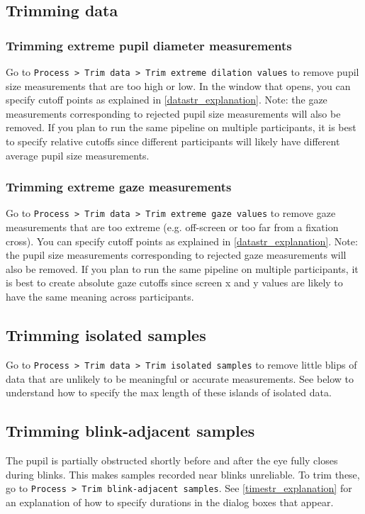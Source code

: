 \documentclass{article}
\begin{document}
\subsection{Trimming data}
\subsubsection{Trimming extreme pupil diameter measurements}
Go to \texttt{Process > Trim data > Trim extreme dilation values} to remove pupil size measurements that are too high or low. In the window that opens, you can specify cutoff points as explained in \ref{datastr_explanation}. Note: the gaze measurements corresponding to rejected pupil size measurements will also be removed. If you plan to run the same pipeline on multiple participants, it is best to specify relative cutoffs since different participants will likely have different average pupil size measurements.
\subsubsection{Trimming extreme gaze measurements}
Go to \texttt{Process > Trim data > Trim extreme gaze values} to remove gaze measurements that are too extreme (e.g. off-screen or too far from a fixation cross). You can specify cutoff points as explained in \ref{datastr_explanation}. Note: the pupil size measurements corresponding to rejected gaze measurements will also be removed. If you plan to run the same pipeline on multiple participants, it is best to create absolute gaze cutoffs since screen x and y values are likely to have the same meaning across participants.
\subsection{Trimming isolated samples}
Go to \texttt{Process > Trim data > Trim isolated samples} to remove little blips of data that are unlikely to be meaningful or accurate measurements. See below to understand how to specify the max length of these islands of isolated data.
\subsection{Trimming blink-adjacent samples}
The pupil is partially obstructed shortly before and after the eye fully closes during blinks. This makes samples recorded near blinks unreliable. To trim these, go to \texttt{Process > Trim blink-adjacent samples}. See \ref{timestr_explanation} for an explanation of how to specify durations in the dialog boxes that appear.
\end{document}
